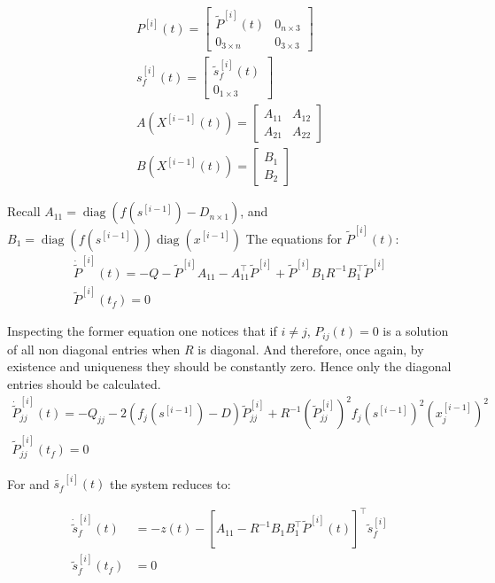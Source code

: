 \documentclass[3p,times]{article}
\DeclareMathOperator{\diag}{diag}
\begin{document}
\begin{align}
P^{[i]}(t) = \begin{bmatrix}
\tilde{P}^{[i]}(t) & 0_{n\times 3} \\ 0_{3 \times n} & 0_{3 \times 3}
\end{bmatrix} \\
s_f^{[i]}(t) = \begin{bmatrix}
\tilde{s}_f^{[i]}(t) \\ 0_{1\times 3}
\end{bmatrix} \\
A\left (X^{[i-1]}(t)\right) = \begin{bmatrix}
A_{11} & A_{12} \\ A_{21} & A_{22}
\end{bmatrix} \\
B\left (X^{[i-1]}(t)\right) = \begin{bmatrix}
B_1 \\ B_2
\end{bmatrix} 
\end{align}


Recall $A_{11} = \diag \left( f\left(s^{[i-1]}\right)- D_{n\times 1} \right)$, and $B_1 = \diag\left(f\left(s^{[i-1]}\right)\right)\diag \left(x^{[i-1]} \right) $ The equations for $\tilde{P}^{[i]}(t)$:
\begin{align}
\dot{\tilde{P}}^{[i]}(t)= -Q- \tilde{P}^{[i]}A_{11} -A_{11}^\top \tilde{P}^{[i]} +  \tilde{P}^{[i]}B_1R^{-1}B_1^\top \tilde{P}^{[i]} \\
\tilde{P}^{[i]}(t_f) = 0
\end{align}

Inspecting the former equation one notices that if $i\neq j$, $P_{ij}(t) = 0$ is a solution of all non diagonal entries when $R$ is diagonal. And therefore, once again, by existence and uniqueness they should be constantly zero. Hence only the diagonal entries should be calculated. 
\begin{align}
\dot{\tilde{P}}^{[i]}_{jj}(t)= -Q_{jj}- 2 \left(f_j\left(s^{[i-1]}\right)- D \right)\tilde{P}^{[i]}_{jj} + R^{-1}\left(\tilde{P}^{[i]}_{jj}\right)^2f_j\left(s^{[i-1]}\right)^2\left(x^{[i-1]}_j\right)^2  \\
\tilde{P}^{[i]}_{jj}(t_f) = 0
\end{align}

For and  $\tilde{s_f}^{[i]}(t)$ the system reduces to:

\begin{align}
\dot{\tilde{s}}_f^{[i]}(t) &= -z(t)- \left[A_{11} -R^{-1}B_1B_1^\top \tilde{P}^{[i]}(t) \right]^\top \tilde{s}_f^{[i]} \\
\tilde{s}_f^{[i]}(t_f) &= 0
\end{align}
\end{document}
